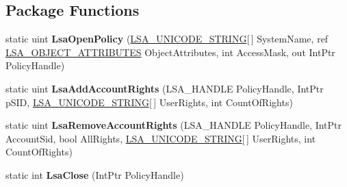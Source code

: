 \subsection*{Package Functions}
\begin{DoxyCompactItemize}
\item 
\mbox{\label{class_pipes_provider_1_1_security_1_1_l_s_a_1_1_lsa_security_wrapper_a773aa7b67cb9fc5616dc6bd1a619b225}} 
static uint {\bfseries Lsa\+Open\+Policy} (\mbox{\hyperlink{struct_pipes_provider_1_1_security_1_1_l_s_a_1_1_l_s_a___u_n_i_c_o_d_e___s_t_r_i_n_g}{L\+S\+A\+\_\+\+U\+N\+I\+C\+O\+D\+E\+\_\+\+S\+T\+R\+I\+NG}}\mbox{[}$\,$\mbox{]} System\+Name, ref \mbox{\hyperlink{struct_pipes_provider_1_1_security_1_1_l_s_a_1_1_l_s_a___o_b_j_e_c_t___a_t_t_r_i_b_u_t_e_s}{L\+S\+A\+\_\+\+O\+B\+J\+E\+C\+T\+\_\+\+A\+T\+T\+R\+I\+B\+U\+T\+ES}} Object\+Attributes, int Access\+Mask, out Int\+Ptr Policy\+Handle)
\item 
\mbox{\label{class_pipes_provider_1_1_security_1_1_l_s_a_1_1_lsa_security_wrapper_adda333d87687ba6906a623db79a9adfa}} 
static uint {\bfseries Lsa\+Add\+Account\+Rights} (L\+S\+A\+\_\+\+H\+A\+N\+D\+LE Policy\+Handle, Int\+Ptr p\+S\+ID, \mbox{\hyperlink{struct_pipes_provider_1_1_security_1_1_l_s_a_1_1_l_s_a___u_n_i_c_o_d_e___s_t_r_i_n_g}{L\+S\+A\+\_\+\+U\+N\+I\+C\+O\+D\+E\+\_\+\+S\+T\+R\+I\+NG}}\mbox{[}$\,$\mbox{]} User\+Rights, int Count\+Of\+Rights)
\item 
\mbox{\label{class_pipes_provider_1_1_security_1_1_l_s_a_1_1_lsa_security_wrapper_adc48b947899763c20b59951bd7d4bf1e}} 
static uint {\bfseries Lsa\+Remove\+Account\+Rights} (L\+S\+A\+\_\+\+H\+A\+N\+D\+LE Policy\+Handle, Int\+Ptr Account\+Sid, bool All\+Rights, \mbox{\hyperlink{struct_pipes_provider_1_1_security_1_1_l_s_a_1_1_l_s_a___u_n_i_c_o_d_e___s_t_r_i_n_g}{L\+S\+A\+\_\+\+U\+N\+I\+C\+O\+D\+E\+\_\+\+S\+T\+R\+I\+NG}}\mbox{[}$\,$\mbox{]} User\+Rights, int Count\+Of\+Rights)
\item 
\mbox{\label{class_pipes_provider_1_1_security_1_1_l_s_a_1_1_lsa_security_wrapper_a1e3a45dcb55bd6d339ccf426bc600022}} 
static int {\bfseries Lsa\+Close} (Int\+Ptr Policy\+Handle)
\end{DoxyCompactItemize}
